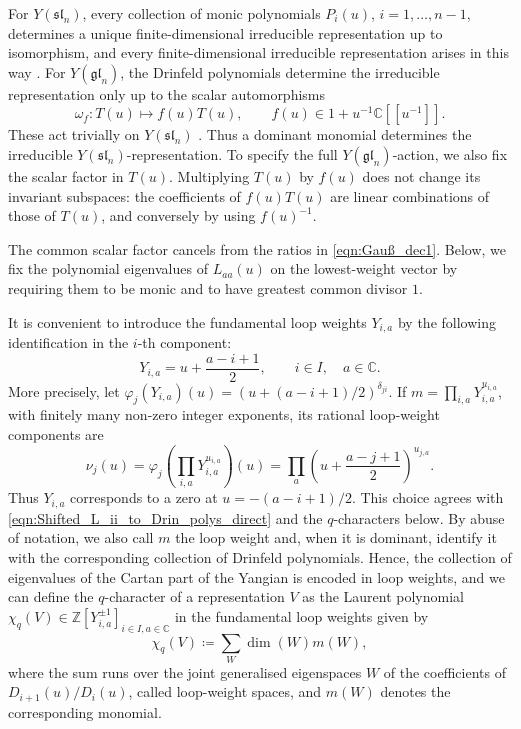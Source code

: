 \documentclass[12pt,reqno]{amsart}
\newcommand{\C}{{\mathbb C}}
\numberwithin{equation}{section}
\begin{document}
    For $Y(\mathfrak{sl}_n)$, every collection of monic polynomials
    $P_i(u)$, $i=1,\ldots,n-1$, determines a unique finite-dimensional
    irreducible representation up to isomorphism, and every finite-dimensional
    irreducible representation arises in this way \cite{FR,FM,CPBook,NT1998}.
    For $Y(\mathfrak{gl}_n)$, the Drinfeld polynomials determine the
    irreducible representation only up to the scalar automorphisms
    \begin{equation}
        \omega_f:T(u)\longmapsto f(u)T(u),
        \qquad f(u)\in1+u^{-1}\C[[u^{-1}]].
        \label{eqn:scalar_Yangian_twist}
    \end{equation}
    These act trivially on $Y(\mathfrak{sl}_n)$ \cite{NT1998,Nazarov2002}.
    Thus a dominant monomial determines the irreducible
    $Y(\mathfrak{sl}_n)$-representation. To specify the full
    $Y(\mathfrak{gl}_n)$-action, we also fix the scalar factor in
    $T(u)$. Multiplying $T(u)$ by $f(u)$ does not change its
    invariant subspaces: the coefficients of $f(u)T(u)$ are linear
    combinations of those of $T(u)$, and conversely by using $f(u)^{-1}$.

    The common scalar factor cancels from the ratios in
    \eqref{eqn:Gauß_dec1}. Below, we fix the polynomial eigenvalues
    of $L_{aa}(u)$ on the lowest-weight vector by requiring them
    to be monic and to have greatest common divisor $1$.

    
    It is convenient to introduce the fundamental loop weights
    $Y_{i,a}$ by the following identification in the $i$-th component:
    \begin{equation}
        Y_{i,a}= u+\frac{a-i+1}{2},
        \qquad i\in I,\quad a\in\C.
        \label{eqn:fund_l-weights}
    \end{equation}
    More precisely, let $\varphi_j(Y_{i,a})(u)=(u+(a-i+1)/2)^{\delta_{ji}}$. If
    $m=\prod_{i,a}Y_{i,a}^{u_{i,a}}$, with finitely many non-zero integer
    exponents, its rational loop-weight components are
    \begin{equation*}
        \nu_j(u)=\varphi_j\!\left(\prod_{i,a}Y_{i,a}^{u_{i,a}}\right)(u)
        =\prod_a\left(u+\frac{a-j+1}{2}\right)^{u_{j,a}}.
    \end{equation*}
    Thus $Y_{i,a}$ corresponds to a zero at $u=-(a-i+1)/2$.
    This choice agrees with \eqref{eqn:Shifted_L_ii_to_Drin_polys_direct}
    and the $q$-characters below. By abuse of notation, we also call
    $m$ the loop weight and, when it is dominant, identify it with the corresponding
    collection of Drinfeld polynomials. Hence, the collection of {eigenvalues} of the Cartan part of the Yangian is encoded in loop weights, and we can define the $q$-character of a representation $V$ as the {Laurent polynomial} $\chi_q(V)\in \mathbb{Z}[Y_{i,a}^{\pm 1}]_{i\in I, a\in\mathbb{C}}$ in the fundamental loop weights given by
	\begin{equation}
		\chi_q(V)\coloneq\sum_{W}\dim(W) m(W),
	\end{equation}
	where the sum runs over the joint generalised eigenspaces $W$
	of the coefficients of $D_{i+1}(u)/D_i(u)$, called loop-weight
	spaces, and $m(W)$ denotes the corresponding monomial.
\end{document}
